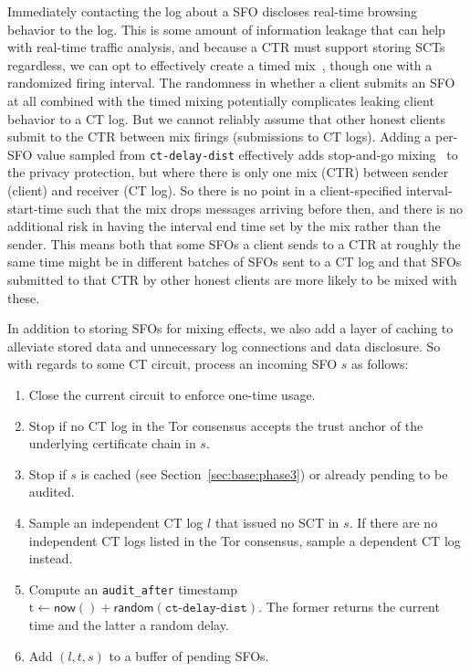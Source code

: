 Immediately contacting the log about a SFO discloses real-time browsing behavior
to the log. This is some amount of information leakage that can help with real-time
traffic analysis, and because a CTR must support storing SCTs regardless, we can
opt to effectively create a timed mix~\cite{trickle02}, though one with a
randomized firing interval. The randomness in whether a client submits an SFO
at all combined with the timed mixing potentially complicates leaking client
behavior to a CT log. But we cannot reliably assume that other honest
clients submit to the CTR between mix firings (submissions to CT
logs). Adding a per-SFO value sampled from \texttt{ct-delay-dist}
effectively adds stop-and-go mixing~\cite{kesdogan:ih1998} to the
privacy protection, but where there is only one mix (CTR) between
sender (client) and receiver (CT log). So there is no point in a
client-specified interval-start-time such that the mix drops messages
arriving before then, and there is no additional risk in having the
interval end time set by the mix rather than the sender. This means
both that some SFOs a client sends to a CTR at roughly the same time
might be in different batches of SFOs sent to a CT log and that SFOs
submitted to that CTR by other honest clients are more likely to be
mixed with these.


In addition to storing SFOs for mixing effects, we also add a layer of caching to
alleviate stored data and unnecessary log connections and data disclosure. So with
regards to some CT circuit, process an incoming SFO $s$ as follows:
\begin{enumerate}
    \item\label{enm:storage:close} Close the current circuit to enforce one-time
        usage.
    \item\label{enm:storage:unrecognized} Stop if no CT log in the Tor consensus
        accepts the trust anchor of the underlying certificate chain in $s$. %
    \item\label{enm:storage:cached}
        Stop if $s$ is cached (see Section~\ref{sec:base:phase3}) or already pending to be audited.
    \item\label{enm:storage:fix-log} Sample an independent CT log $l$ that
        issued no SCT in $s$.  If there are no independent CT logs listed in the
        Tor consensus, sample a dependent CT log instead.
    \item\label{enm:storage:audit-after} Compute an \texttt{audit\_after}
        timestamp $\textrm{t} \gets \mathsf{now()} +
            \mathsf{random}(\texttt{ct-delay-dist})$.
        The former returns the current time and the latter a random delay.
    \item\label{enm:storage:store} Add $(l,t,s)$ to a buffer of pending SFOs.
\end{enumerate}

